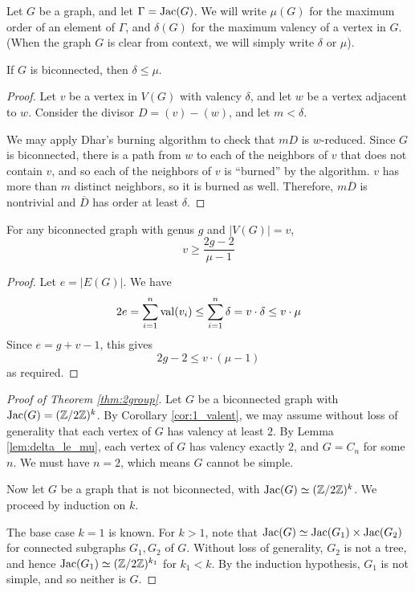 \documentclass{amsart}
\begin{document}
\begin{defn}
  Let $G$ be a graph, and let $\Gamma = \operatorname{Jac}(G)$. We will write $\mu(G)$
  for the maximum order of an element of $\Gamma$, and $\delta(G)$ for
  the maximum valency of a vertex in $G$. (When the graph $G$ is clear
  from context, we will simply write $\delta$ or $\mu$). 
\end{defn}

\begin{lem}
  \label{lem:delta_le_mu}
  If $G$ is biconnected, then $\delta \le \mu$.
\end{lem}
\begin{proof}
  Let $v$ be a vertex in $V(G)$ with valency $\delta$, and let $w$ be
  a vertex adjacent to $w$. Consider the divisor $D = (v) -
  (w)$, and let $m < \delta$. 

  We may apply Dhar's burning algorithm to check that $mD$ is
  $w$-reduced. Since $G$ is biconnected, there is a path from $w$ to
  each of the neighbors of $v$ that does not contain $v$, and so each
  of the neighbors of $v$ is ``burned'' by the algorithm. $v$ has more
  than $m$ distinct neighbors, so it is burned as well. Therefore,
  $m\overline{D}$ is nontrivial and $\overline{D}$ has order at least
  $\delta$.
\end{proof}

\begin{cor}
  \label{cor:genus_v_mu}
  For any biconnected graph with genus $g$ and $|V(G)| = v$,
  \begin{equation*}
    v \ge \frac{2g - 2}{\mu - 1}
  \end{equation*}
\end{cor}
\begin{proof}
  Let $e = |E(G)|$. We have 
  \begin{equation}
    2e = \sum_{i=1}^n \operatorname{val}(v_i) \le \sum_{i=1}^n \delta = v \cdot \delta
    \le v \cdot \mu
  \end{equation}
  Since $e = g + v - 1$, this gives
  \begin{equation}
    2g - 2 \le v \cdot (\mu - 1)
  \end{equation}
  as required.

\end{proof}

\begin{proof}[Proof of Theorem \ref{thm:2group}]
  Let $G$ be a biconnected graph with $\operatorname{Jac}(G) = (\mathbb{Z}/2\mathbb{Z})^k$. By
  Corollary \ref{cor:1_valent}, we may assume without loss of
  generality that each vertex of $G$ has valency at least $2$. By
  Lemma \ref{lem:delta_le_mu}, each vertex of $G$ has valency exactly
  $2$, and $G = C_n$ for some $n$. We must have $n=2$, which means $G$
  cannot be simple.

  Now let $G$ be a graph that is not biconnected, with $\operatorname{Jac}(G) \simeq
  (\mathbb{Z}/2\mathbb{Z})^k$. We proceed by induction on $k$.
  
  The base case $k=1$ is known. For $k > 1$, note that $\operatorname{Jac}(G) \simeq
  \operatorname{Jac}(G_1) \times \operatorname{Jac}(G_2)$ for connected subgraphs $G_1, G_2$ of
  $G$. Without loss of generality, $G_2$ is not a tree, and
  hence $\operatorname{Jac}(G_1) \simeq (\mathbb{Z}/2\mathbb{Z})^{k_1}$ for $k_1 < k$. By the
  induction hypothesis, $G_1$ is not simple, and so neither is $G$.
\end{proof}
\end{document}
